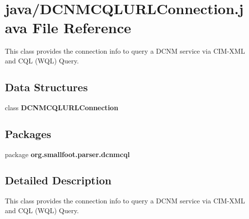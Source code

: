 \section{java/\+D\+C\+N\+M\+C\+Q\+L\+U\+R\+L\+Connection.java File Reference}
\label{DCNMCQLURLConnection_8java}


This class provides the connection info to query a D\+C\+N\+M service via C\+I\+M-\/\+X\+M\+L and C\+Q\+L (W\+Q\+L) Query.  


\subsection*{Data Structures}
\begin{DoxyCompactItemize}
\item 
class {\bf D\+C\+N\+M\+C\+Q\+L\+U\+R\+L\+Connection}
\end{DoxyCompactItemize}
\subsection*{Packages}
\begin{DoxyCompactItemize}
\item 
package {\bf org.\+smallfoot.\+parser.\+dcnmcql}
\end{DoxyCompactItemize}


\subsection{Detailed Description}
This class provides the connection info to query a D\+C\+N\+M service via C\+I\+M-\/\+X\+M\+L and C\+Q\+L (W\+Q\+L) Query. 


